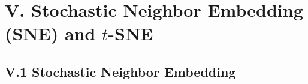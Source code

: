 \documentclass[12pt]{article}
\begin{document}
%		
%		
%				
%	
%	
%		
%		
%


\section*{V. Stochastic Neighbor Embedding (SNE) and $t$-SNE}

\subsection*{V.1 Stochastic Neighbor Embedding}
\end{document}
